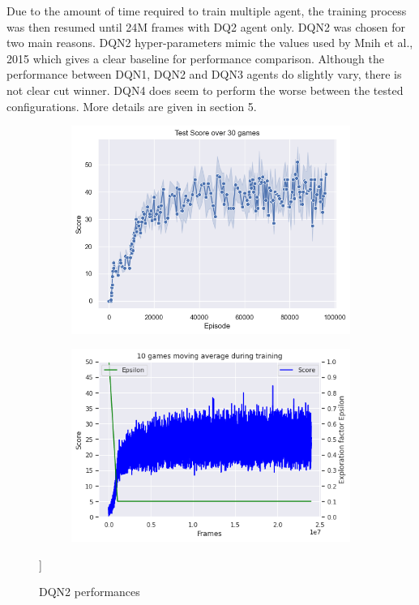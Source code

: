 \documentclass{article}
\begin{document}
Due to the amount of time required to train multiple agent, the training process was then resumed until 24M frames with DQ2 agent only. DQN2 was chosen for two main reasons. DQN2 hyper-parameters mimic the values used by Mnih et al., 2015 which gives a clear baseline for performance comparison. Although the performance between DQN1, DQN2 and DQN3 agents do slightly vary, there is not clear cut winner. DQN4 does seem to perform the worse between the tested configurations. More details are given in section 5.

\begin{figure}[H]
\centering
\begin{subfigure}{0.49\textwidth}
\centering
\includegraphics[scale=0.46]{DQNTestScore.PNG}
\end{subfigure}
\begin{subfigure}{0.49\textwidth}
\centering
\includegraphics[scale=0.46]{DQNMovAvgTraining.PNG}
\end{subfigure}
\caption[width=0.7\textwidth]{DQN2 performances}]
\label{fig:DQN2}
\end{figure}
\end{document}
